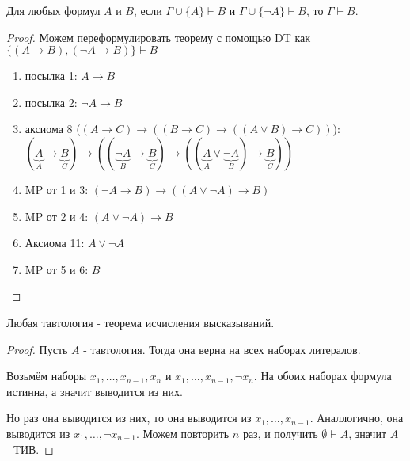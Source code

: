 \begin{lemma} \label{logic_collapse} \thmslashn

    Для любых формул $A$ и $B$, если $\Gamma \cup \{A\} \vdash B$ и $\Gamma \cup \{\neg A\} \vdash B $, то $\Gamma \vdash B$.
    \begin{proof} \thmslashn

        Можем переформулировать теорему с помощью DT как $\{(A \to B), (\neg A \to B)\} \vdash B $ 
        \begin{enumerate}
            \item посылка 1: $A\to B$
            \item посылка 2: $\neg A \to B$
            \item аксиома 8 ($(A \to C) \to ((B \to C) \to ((A \lor B) \to C))$): \\
                $(\underbrace{A}_{A} \to \underbrace{B}_{C}) \to ((\underbrace{\neg A}_{B} \to \underbrace{B}_{C}) \to ((\underbrace{A}_{A} \lor \underbrace{\neg A}_{B} ) \to \underbrace{B}_{C} )) $
            \item MP от 1 и 3: $(\neg A \to B) \to ((A \lor \neg A) \to B)$
            \item MP от 2 и 4: $(A \lor \neg A) \to B$
            \item Аксиома 11: $A \lor \neg A$
            \item MP от 5 и 6: $B$ \qedhere
        \end{enumerate}
    \end{proof}
\end{lemma}
\begin{theorem} \label{logic_completeness_1} \thmslashn

    Любая тавтология - теорема исчисления высказываний.
    \begin{proof} \thmslashn

        Пусть $A$ - тавтология. Тогда она верна на всех наборах литералов.

        Возьмём наборы $x_1, \ldots, x_{n-1}, x_{n}$ и $x_1, \ldots, x_{n-1}, \neg x_{n}$. На обоих наборах формула истинна, а значит выводится из них. 

        Но раз она выводится из них, то она выводится из $x_1, \ldots, x_{n-1}$. Аналлогично, она выводится из $x_1, \ldots, \neg x_{n-1}$. Можем повторить $n$ раз, и получить $ \emptyset \vdash A$, значит $A$ - ТИВ.
    \end{proof}
\end{theorem}
